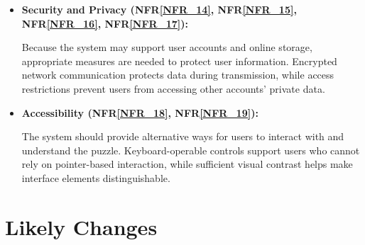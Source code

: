 \documentclass[12pt]{article}
\begin{document}
\begin{itemize}
\item \textbf{Security and Privacy
(NFR\ref{NFR_14},
NFR\ref{NFR_15},
NFR\ref{NFR_16},
NFR\ref{NFR_17}):}

Because the system may support user accounts and online storage,
appropriate measures are needed to protect user information.
Encrypted network communication protects data during transmission,
while access restrictions prevent users from accessing other
accounts' private data.

\item \textbf{Accessibility
(NFR\ref{NFR_18},
NFR\ref{NFR_19}):}

The system should provide alternative ways for users to interact
with and understand the puzzle. Keyboard-operable controls support
users who cannot rely on pointer-based interaction, while sufficient
visual contrast helps make interface elements distinguishable.

\end{itemize}

\section{Likely Changes}    
\end{document}
